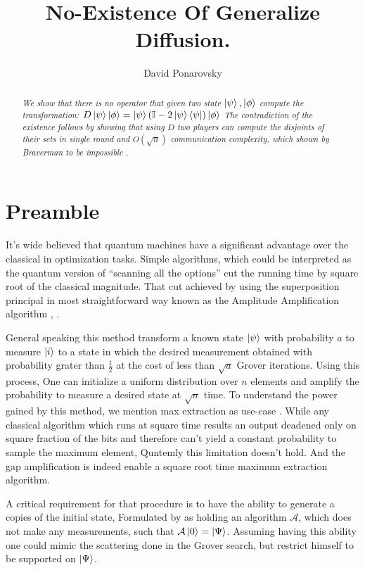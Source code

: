 \documentclass{article}
\begin{document}
\title{No-Existence Of Generalize Diffusion.}
\author{David Ponarovsky}
\maketitle

\begin{abstract}\textit{We show that there is no operator that given two state $\ket{\psi},\ket{\phi}$ compute the transformation: $D \ket{\psi}\ket{\phi} = \ket{\psi}\left( \mathbb{I} - 2 \ket{\psi}\bra{\psi} \right)\ket{\phi} $ The contradiction of the existence follows by showing that using $D$ two players can compute the disjoints of their sets in single round and $O\left( \sqrt{n} \right)$ communication complexity, which shown by Braverman to be impossible \cite{Braverman}. }
\end{abstract}

\section{Preamble} It's wide believed that quantum machines have a significant advantage over the classical in optimization tasks. Simple algorithms, which could be interpreted as the quantum version of ``scanning all the options'' cut the running time by square root of the classical magnitude. That cut achieved by using the superposition principal in most straightforward way known as the Amplitude Amplification algorithm \cite{Brassard_2002}, \cite{grover1996fast}. 

General speaking this method transform a known state $\ket{\psi}$  with probability $a$ to measure $\ket{i}$ to a state in which the desired measurement obtained with probability grater than $\frac{1}{2}$ at the cost of less than $\sqrt{a}$ Grover iterations. Using this process, One can initialize a uniform distribution over $n$ elements and amplify the probability to measure a desired state at $\sqrt{n}$ time. To understand the power gained by this method, we mention max extraction as use-case \cite{ahuja1999quantum}. While any classical algorithm which runs at square time results an output deadened only on square fraction of the bits and therefore can't yield a constant probability to sample the maximum element, Quntemly this limitation doesn't hold. And the gap amplification is indeed enable a square root time maximum extraction algorithm. 
  
  A critical requirement for that procedure is to have the ability to generate a copies of the initial state, Formulated by \cite{Brassard_2002} as holding an algorithm $\mathcal{A}$, which does not make any measurements, such that $\mathcal{A}\ket{0}=\ket{\Psi}$. Assuming having this ability one could mimic the scattering done in the Grover search, but restrict himself to be supported on $\ket{\Psi}$. 
\end{document}
